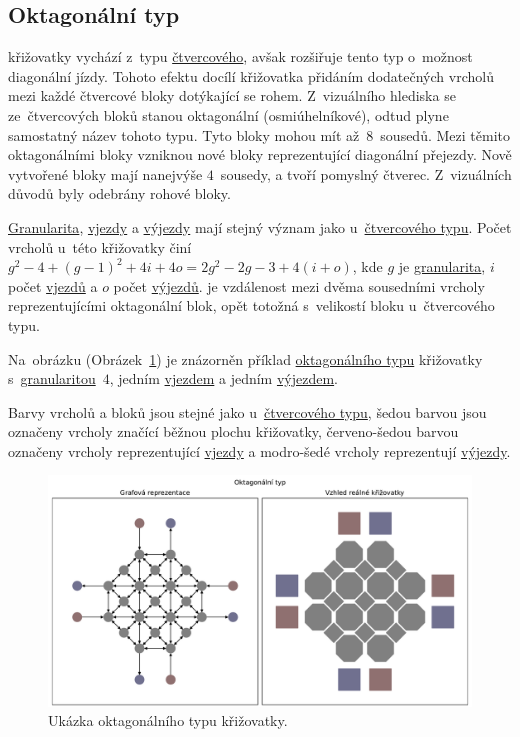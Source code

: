 \subsection{Oktagonální typ}\label{subsec:oktagonalni_typ}

 křižovatky vychází z~typu \hyperref[subsec:ctvercovy_typ]{čtvercového},
avšak rozšiřuje tento typ o~možnost diagonální jízdy.
Tohoto efektu docílí křižovatka přidáním dodatečných vrcholů mezi každé čtvercové bloky dotýkající se rohem.
Z~vizuálního hlediska se ze~čtvercových bloků stanou oktagonální (osmiúhelníkové),
odtud plyne samostatný název tohoto typu.
Tyto bloky mohou mít až~$8$~sousedů.
Mezi těmito oktagonálními bloky vzniknou nové bloky reprezentující diagonální přejezdy.
Nově vytvořené bloky mají nanejvýše $4$~sousedy, a tvoří pomyslný čtverec.
Z~vizuálních důvodů byly odebrány rohové bloky.

\hyperref[par:granularita]{Granularita}, \hyperref[par:vjezdy]{vjezdy} a \hyperref[par:vyjezdy]{výjezdy}
mají stejný význam jako u~\hyperref[subsec:ctvercovy_typ]{čtvercového typu}.
Počet vrcholů u~této křižovatky činí $g^2 - 4 + (g-1)^2 + 4i + 4o = 2g^2 - 2g - 3 + 4(i + o)$,
kde $g$ je \hyperref[par:granularita]{granularita},
$i$ počet \hyperref[par:vjezdy]{vjezdů} a $o$ počet \hyperref[par:vyjezdy]{výjezdů}.
 je vzdálenost mezi dvěma sousedními vrcholy reprezentujícími oktagonální blok,
opět totožná s~velikostí bloku u~čtvercového typu.

Na~obrázku (Obrázek~\ref{fig:octagonal_type_graph}) je znázorněn příklad
\hyperref[subsec:oktagonali_typ]{oktagonálního typu} křižovatky s~\hyperref[par:granularita]{granularitou}~$4$,
jedním \hyperref[par:vjezdy]{vjezdem} a jedním \hyperref[par:vyjezdy]{výjezdem}.

Barvy vrcholů a bloků jsou stejné jako u~\hyperref[subsec:ctvercovy_typ]{čtvercového typu},
šedou barvou jsou označeny vrcholy značící běžnou plochu křižovatky,
červeno-šedou barvou označeny vrcholy reprezentující \hyperref[par:vjezdy]{vjezdy} a
modro-šedé vrcholy reprezentují \hyperref[par:vyjezdy]{výjezdy}.

\begin{figure}[h]
	\centering
	\includegraphics[width=\textwidth]{../img/Octagonal_grid}
	\caption{Ukázka oktagonálního typu křižovatky.}
	\label{fig:octagonal_type_graph}
\end{figure}

